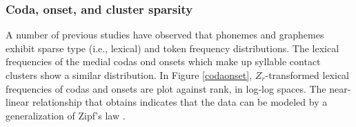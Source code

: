 \subsubsection{Coda, onset, and cluster sparsity}

A number of previous studies \citep[e.g.,][]{Sigurd1968,Good1969,Borodovsky1989,Witten1990,Martindale1996,Tambovtsev2007} have observed that phonemes and graphemes exhibit sparse type (i.e., lexical) and token frequency distributions. The lexical frequencies of the medial codas ond onsets which make up syllable contact clusters show a similar distribution. In Figure \ref{codaonset}, $Z_r$-transformed lexical frequencies of codas and onsets are plot against rank, in log-log spaces. The near-linear relationship that obtains indicates that the data can be modeled by a generalization of Zipf's law \citep{Zipf1949}.

